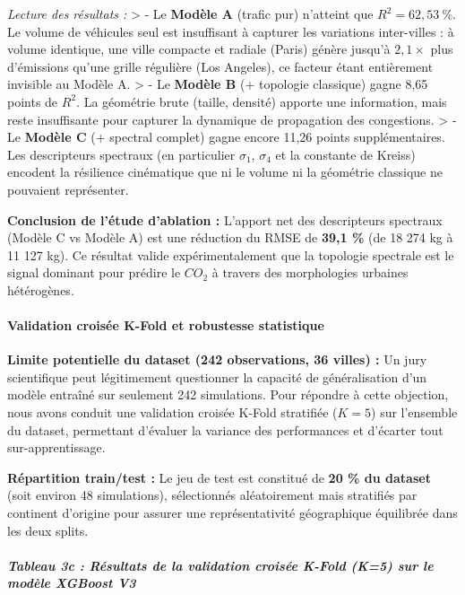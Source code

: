 \documentclass[10pt, a4paper]{article}
\begin{document}
\emph{Lecture des résultats :} \textgreater{} - Le \textbf{Modèle A}
(trafic pur) n'atteint que \(R^2 = 62{,}53\ \%\). Le volume de véhicules
seul est insuffisant à capturer les variations inter-villes : à volume
identique, une ville compacte et radiale (Paris) génère jusqu'à
\(2{,}1\times\) plus d'émissions qu'une grille régulière (Los Angeles),
ce facteur étant entièrement invisible au Modèle A. \textgreater{} - Le
\textbf{Modèle B} (+ topologie classique) gagne 8,65 points de \(R^2\).
La géométrie brute (taille, densité) apporte une information, mais reste
insuffisante pour capturer la dynamique de propagation des congestions.
\textgreater{} - Le \textbf{Modèle C} (+ spectral complet) gagne encore
11,26 points supplémentaires. Les descripteurs spectraux (en particulier
\(\sigma_1\), \(\sigma_4\) et la constante de Kreiss) encodent la
résilience cinématique que ni le volume ni la géométrie classique ne
pouvaient représenter.

\textbf{Conclusion de l'étude d'ablation :} L'apport net des
descripteurs spectraux (Modèle C vs Modèle A) est une réduction du RMSE
de \textbf{39,1 \%} (de 18 274 kg à 11 127 kg). Ce résultat valide
expérimentalement que la topologie spectrale est le signal dominant pour
prédire le \(CO_2\) à travers des morphologies urbaines hétérogènes.

\paragraph{Validation croisée K-Fold et robustesse
statistique}\label{validation-croisuxe9e-k-fold-et-robustesse-statistique}

\textbf{Limite potentielle du dataset (242 observations, 36 villes) :}
Un jury scientifique peut légitimement questionner la capacité de
généralisation d'un modèle entraîné sur seulement 242 simulations. Pour
répondre à cette objection, nous avons conduit une validation croisée
K-Fold stratifiée (\(K=5\)) sur l'ensemble du dataset, permettant
d'évaluer la variance des performances et d'écarter tout
sur-apprentissage.

\textbf{Répartition train/test :} Le jeu de test est constitué de
\textbf{20 \% du dataset} (soit environ 48 simulations), sélectionnés
aléatoirement mais stratifiés par continent d'origine pour assurer une
représentativité géographique équilibrée dans les deux splits.

\subparagraph{Tableau 3c : Résultats de la validation croisée K-Fold
(K=5) sur le modèle XGBoost
V3}\label{tableau-3c-ruxe9sultats-de-la-validation-croisuxe9e-k-fold-k5-sur-le-moduxe8le-xgboost-v3}
\end{document}
